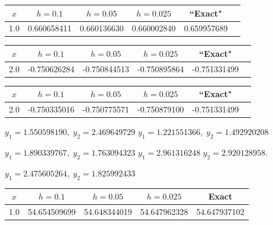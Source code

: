 \bigskip

{\small
{}
\begin{tabular}{|c|r|r|r|r|r|}
\hline
\multicolumn{1}{|c|}{$x$}&
\multicolumn{1}{|c|}{$h=0.1$}&
\multicolumn{1}{|c|}{$h=0.05$}&
\multicolumn{1}{|c|}{$h=0.025$}&
\multicolumn{1}{|c|}{``Exact"}\\ \hline
1.0 & 0.660658411 & 0.660136630 & 0.660002840 & 0.659957689 \\
\hline
\end{tabular}}

\bigskip

{\small
{}
\begin{tabular}{|c|r|r|r|r|r|}
\hline
\multicolumn{1}{|c|}{$x$}&
\multicolumn{1}{|c|}{$h=0.1$}&
\multicolumn{1}{|c|}{$h=0.05$}&
\multicolumn{1}{|c|}{$h=0.025$}&
\multicolumn{1}{|c|}{``Exact"}\\ \hline
2.0 &-0.750626284 &-0.750844513  &-0.750895864  & -0.751331499 \\
\hline
\end{tabular}}

{\small
{}
\begin{tabular}{|c|r|r|r|r|r|}
\hline
\multicolumn{1}{|c|}{$x$}&
\multicolumn{1}{|c|}{$h=0.1$}&
\multicolumn{1}{|c|}{$h=0.05$}&
\multicolumn{1}{|c|}{$h=0.025$}&
\multicolumn{1}{|c|}{``Exact"}\\ \hline
2.0 &-0.750335016 &-0.750775571  & -0.750879100 & -0.751331499 \\
\hline
\end{tabular}}


$y_1=1.550598190,\; y_2=2.469649729$
$y_1=1.221551366,\; y_2=1.492920208$

$y_1=1.890339767,\; y_2=1.763094323$
$ y_1=2.961316248$\; $ y_2=2.920128958$.

$y_1=2.475605264,\; y_2=1.825992433$

\medskip

{\small
{}
\begin{tabular}{|c|r|r|r|r|}\hline
\multicolumn{1}{|c|}{$x$}&
\multicolumn{1}{|c|}{$h=0.1$}&
\multicolumn{1}{|c|}{$h=0.05$}&
\multicolumn{1}{|c|}{$h=0.025$}&
\multicolumn{1}{|c|}{Exact}\\ \hline
1.0 &  54.654509699 & 54.648344019 & 54.647962328 &  54.647937102 \\
\hline
\end{tabular}}\bigskip

